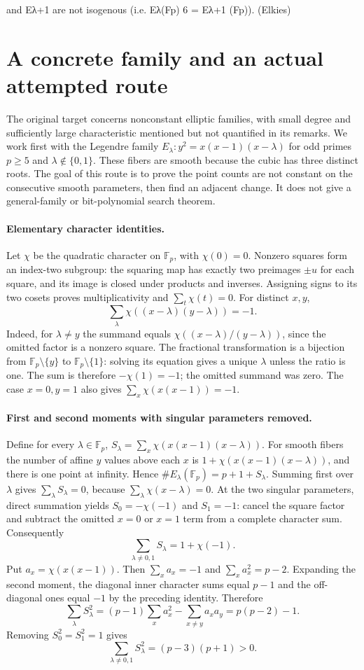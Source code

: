 \documentclass[11pt]{article}
\begin{document}
and Eλ+1 are not isogenous (i.e. Eλ(Fp) 6 = Eλ+1 (Fp)). (Elkies)

\section{A concrete family and an actual attempted route}
The original target concerns nonconstant elliptic families, with small
degree and sufficiently large characteristic mentioned but not quantified
in its remarks. We work first with the Legendre family
$E_\lambda:y^2=x(x-1)(x-\lambda)$ for odd primes $p\ge5$ and
$\lambda\notin\{0,1\}$. These fibers are smooth because the cubic
has three distinct roots. The goal of this route is to prove the point
counts are not constant on the consecutive smooth parameters, then find
an adjacent change. It does not give a general-family or bit-polynomial
search theorem.

\paragraph{Elementary character identities.}
Let $\chi$ be the quadratic character on $\mathbb F_p$, with
$\chi(0)=0$. Nonzero squares form an index-two subgroup: the squaring
map has exactly two preimages $\pm u$ for each square, and its image
is closed under products and inverses. Assigning signs to its two
cosets proves multiplicativity and $\sum_t\chi(t)=0$.
For distinct $x,y$,
\[
\sum_\lambda\chi((x-\lambda)(y-\lambda))=-1.
\]
Indeed, for $\lambda\ne y$ the summand equals
$\chi((x-\lambda)/(y-\lambda))$, since the omitted factor is a
nonzero square. The fractional transformation is a bijection from
$\mathbb F_p\setminus\{y\}$ to $\mathbb F_p\setminus\{1\}$:
solving its equation gives a unique $\lambda$ unless the ratio is one.
The sum is therefore $-\chi(1)=-1$; the omitted summand was zero.
The case $x=0,y=1$ also gives
$\sum_x\chi(x(x-1))=-1$.

\paragraph{First and second moments with singular parameters removed.}
Define for every $\lambda\in\mathbb F_p$,
$S_\lambda=\sum_x\chi(x(x-1)(x-\lambda))$.
For smooth fibers the number of affine $y$ values above each $x$ is
$1+\chi(x(x-1)(x-\lambda))$, and there is one point at infinity.
Hence $\#E_\lambda(\mathbb F_p)=p+1+S_\lambda$.
Summing first over $\lambda$ gives $\sum_\lambda S_\lambda=0$,
because $\sum_\lambda\chi(x-\lambda)=0$.
At the two singular parameters, direct summation yields
$S_0=-\chi(-1)$ and $S_1=-1$: cancel the square factor and subtract
the omitted $x=0$ or $x=1$ term from a complete character sum.
Consequently
\[
\sum_{\lambda\ne0,1}S_\lambda=1+\chi(-1).
\]
Put $a_x=\chi(x(x-1))$. Then $\sum_xa_x=-1$ and
$\sum_xa_x^2=p-2$. Expanding the second moment, the diagonal inner
character sums equal $p-1$ and the off-diagonal ones equal $-1$ by
the preceding identity. Therefore
\[
\sum_\lambda S_\lambda^2
=(p-1)\sum_xa_x^2-\sum_{x\ne y}a_xa_y
=p(p-2)-1.
\]
Removing $S_0^2=S_1^2=1$ gives
\[
\sum_{\lambda\ne0,1}S_\lambda^2=(p-3)(p+1)>0.
\]
\end{document}
